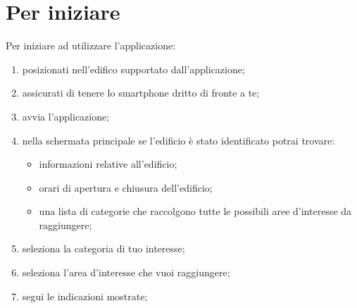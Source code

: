 \documentclass[../ClipsManualeUtente.tex]{subfiles}
\begin{document}
\section{Per iniziare}
	Per iniziare ad utilizzare l'applicazione:
	\begin{enumerate}
		\item posizionati nell'edifico supportato dall'applicazione;
		\item assicurati di tenere lo smartphone dritto di fronte a te;
		\item avvia l'applicazione;
		\item nella schermata principale se l'edificio è stato identificato potrai trovare:
		\begin{itemize}
			\item informazioni relative all'edificio;
			\item orari di apertura e chiusura dell'edificio;
			\item una lista di categorie che raccolgono tutte le possibili aree d'interesse da raggiungere;
		\end{itemize}
		\item seleziona la categoria di tuo interesse;
		\item seleziona l'area d'interesse che vuoi raggiungere;
		\item segui le indicazioni mostrate;
	\end{enumerate}
\end{document}
